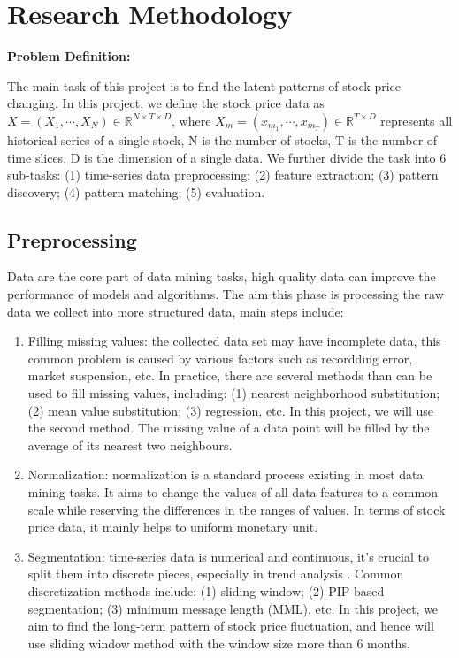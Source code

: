 \chapter{Research Methodology}
\label{ch:Methodology}

\textbf{Problem Definition: }

The main task of this project is to find the latent patterns of stock price changing. In this project, we define the stock price data as $X = (X_1, \cdots, X_N) \in \mathbb{R}^{N \times T \times D} $, where $X_m = (x_{m_1},\cdots, x_{m_T}) \in \mathbb{R}^{T \times D} $ represents all historical series of a single stock, N is the number of stocks, T is the number of time slices, D is the dimension of a single data.  We further divide the task into 6 sub-tasks: (1) time-series data preprocessing; (2) feature extraction; (3) pattern discovery; (4) pattern matching; (5) evaluation.


\section{Preprocessing}
\label{sec:Preprocessing}
Data are the core part of data mining tasks, high quality data can improve the performance of models and algorithms. The aim this phase is processing the raw data we collect into more structured data, main steps include:
\begin{enumerate}
    \item Filling missing values: the collected data set may have incomplete data, this common problem is caused by various factors such as recordding error, market suspension, etc. In practice, there are several methods than can be used to fill missing values, including: (1) nearest neighborhood substitution; (2) mean value substitution; (3) regression, etc. In this project, we will use the second method. The missing value of a data point will be filled by the average of its nearest two neighbours.
    \item Normalization: normalization is a standard process existing in most data mining tasks. It aims to change the values of all data features to a common scale while reserving the differences in the ranges of values. In terms of stock price data, it mainly helps to uniform monetary unit.
    \item Segmentation: time-series data is numerical and continuous, it's crucial to split them into discrete pieces, especially in trend analysis \cite{fu2011review}. Common discretization methods include: (1) sliding window; (2) PIP based segmentation; (3) minimum message length (MML), etc. In this project, we aim to find the long-term pattern of stock price fluctuation, and hence will use sliding window method with the window size more than 6 months.
\end{enumerate}

